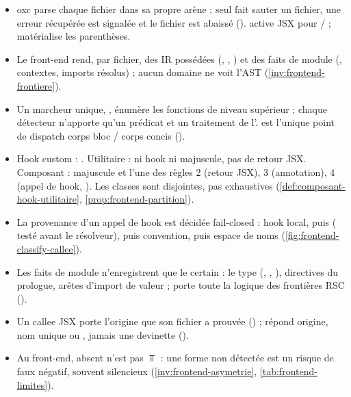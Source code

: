 \begin{resume}
\begin{sloppypar}
\begin{itemize}
  \item oxc parse chaque fichier dans sa propre arène ; seul  fait sauter un fichier, une erreur récupérée est signalée et le fichier est abaissé ().  active JSX pour / ;  matérialise les parenthèses.
  \item Le front-end rend, par fichier, des IR possédées (, , ) et des faits de module (, contextes, imports résolus) ; aucun domaine ne voit l'AST (\cref{inv:frontend-frontiere}).
  \item Un marcheur unique, , énumère les fonctions de niveau supérieur ; chaque détecteur n'apporte qu'un prédicat  et un traitement de l'.  est l'unique point de dispatch corps bloc / corps concis ().
  \item Hook custom : . Utilitaire : ni hook ni majuscule, pas de retour JSX. Composant : majuscule et l'une des règles 2 (retour JSX), 3 (annotation), 4 (appel de hook, ). Les classes sont disjointes, pas exhaustives (\cref{def:composant-hook-utilitaire}, \cref{prop:frontend-partition}).
  \item La provenance d'un appel de hook est décidée fail-closed : hook local, puis  ( testé avant le résolveur), puis convention, puis espace de noms (\cref{fig:frontend-classify-callee}).
  \item Les faits de module n'enregistrent que le certain : le type  (, , ), directives du prologue, arêtes d'import de valeur ;  porte toute la logique des frontières RSC ().
  \item Un callee JSX porte l'origine que son fichier a prouvée () ;  répond origine, nom unique ou , jamais une devinette ().
  \item Au front-end, absent n'est pas $\Top$ : une forme non détectée est un risque de faux négatif, souvent silencieux (\cref{inv:frontend-asymetrie}, \cref{tab:frontend-limites}).

\end{itemize}
\end{sloppypar}
\end{resume}
